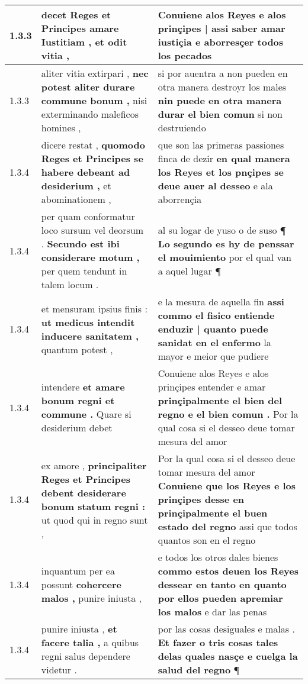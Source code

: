 \begin{tabular}{|p{1cm}|p{6.5cm}|p{6.5cm}|}
1.3.3 & decet Reges \textbf{ et Principes amare Iustitiam , } et odit vitia , & Conuiene alos Reyes \textbf{ e alos prinçipes | assi saber amar iustiçia } e aborresçer todos los pecados \\\hline
1.3.3 & aliter vitia extirpari , \textbf{ nec potest aliter durare commune bonum , } nisi exterminando maleficos homines , & si por auentra a non pueden en otra manera destroyr los males \textbf{ nin puede en otra manera durar el bien comun } si non destruiendo \\\hline
1.3.4 & dicere restat , \textbf{ quomodo Reges et Principes se habere debeant ad desiderium , } et abominationem , & que son las primeras passiones finca de dezir \textbf{ en qual manera los Reyes et los pnçipes se deue auer al desseo } e ala aborrençia \\\hline
1.3.4 & per quam conformatur loco sursum vel deorsum . \textbf{ Secundo est ibi considerare motum , } per quem tendunt in talem locum . & al su logar de yuso o de suso ¶ \textbf{ Lo segundo es hy de penssar el mouimiento } por el qual van a aquel lugar ¶ \\\hline
1.3.4 & et mensuram ipsius finis : \textbf{ ut medicus intendit inducere sanitatem , } quantum potest , & e la mesura de aquella fin \textbf{ assi commo el fisico entiende enduzir | quanto puede sanidat en el enfermo } la mayor e meior que pudiere \\\hline
1.3.4 & intendere \textbf{ et amare bonum regni et commune . } Quare si desiderium debet & Conuiene alos Reyes e alos prinçipes entender e amar \textbf{ prinçipalmente el bien del regno e el bien comun . } Por la qual cosa si el desseo deue tomar mesura del amor \\\hline
1.3.4 & ex amore , \textbf{ principaliter Reges et Principes debent desiderare bonum statum regni : } ut quod qui in regno sunt , & Por la qual cosa si el desseo deue tomar mesura del amor \textbf{ Conuiene que los Reyes e los prinçipes desse en prinçipalmente el buen estado del regno } assi que todos quantos son en el regno \\\hline
1.3.4 & inquantum per ea possunt \textbf{ cohercere malos , } punire iniusta , & e todos los otros dales bienes \textbf{ commo estos deuen los Reyes dessear en tanto en quanto por ellos pueden apremiar los malos } e dar las penas \\\hline
1.3.4 & punire iniusta , \textbf{ et facere talia , } a quibus regni salus dependere videtur . & por las cosas desiguales e malas . \textbf{ Et fazer o tris cosas tales delas quales nasçe e cuelga la salud del regno } ¶ \\\hline

\end{tabular}
